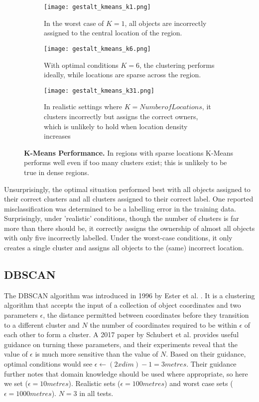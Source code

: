 \begin{figure*}[h]
\centering

\begin{subfigure}[t]{.3\textwidth}
\texttt{[image: gestalt\_kmeans\_k1.png]}
\caption{In the worst case of $K=1$, all objects are incorrectly assigned to the central location of the region.} %
\label{fig:kmeans_worst}
\end{subfigure}
\hfill
\begin{subfigure}[t]{.3\textwidth}
\texttt{[image: gestalt\_kmeans\_k6.png]}
\caption{\small With optimal conditions $K=6$, the clustering performs ideally, while locations are sparse across the region.}
\label{fig:kmeans_optimal}
\end{subfigure}
\hfill
\begin{subfigure}[t]{.3\textwidth}
\texttt{[image: gestalt\_kmeans\_k31.png]}
\caption{\small In realistic settings where $K=Number of Locations$, it clusters incorrectly but assigns the correct owners, which is unlikely to hold when location density increases}
\label{fig:kmeans_realistic}
\hfill
\end{subfigure}

\caption{\textbf{K-Means Performance.} In regions with sparse locations K-Means performs well even if too many clusters exist; this is unlikely to be true in dense regions.}

\label{fig:kmeans_experiments}
\end{figure*}

Unsurprisingly, the optimal situation performed best with all objects assigned to their correct clusters and all clusters assigned to their correct label. One reported misclassification was determined to be a labelling error in the training data. Surprisingly, under 'realistic' conditions, though the number of clusters is far more than there should be, it correctly assigns the ownership of almost all objects with only five incorrectly labelled. Under the worst-case conditions, it only creates a single cluster and assigns all objects to the (same) incorrect location. 

\subsection{DBSCAN}
The DBSCAN algorithm was introduced in 1996 by Ester et al. \cite{Ester1996}. It is a clustering algorithm that accepts the input of a collection of object coordinates and two parameters $\epsilon$, the distance permitted between coordinates before they transition to a different cluster and $N$ the number of coordinates required to be within $\epsilon$ of each other to form a cluster. 
A 2017 paper by Schubert et al. \cite{Schubert2017} provides useful guidance on turning these parameters, and their experiments reveal that the value of $\epsilon$ is much more sensitive than the value of $N$. Based on their guidance, optimal conditions would see $\epsilon \leftarrow (2xdim)-1 = 3metres$. Their guidance further notes that domain knowledge should be used where appropriate, so here we set ($\epsilon = 10 metres$). Realistic sets ($\epsilon = 100 metres$) and worst case sets ($\epsilon = 1000 metres$). $N=3$ in all tests. 

